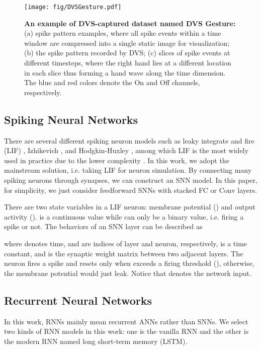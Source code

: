 \documentclass[journal,10pt,twocolumn]{IEEETran}
\begin{document}
\begin{figure}[!htbp]
\centering     
\texttt{[image: fig/DVSGesture.pdf]}
\caption{\textbf{An example of DVS-captured dataset named DVS Gesture:} (a) spike pattern examples, where all spike events within a time window  are compressed into a single static image for visualization; (b) the spike pattern recorded by DVS; (c) slices of spike events at different timesteps, where the right hand lies at a different location in each slice thus forming a hand wave along the time dimension. The blue and red colors denote the On and Off channels, respectively.} \label{fig:DVSGesture} 
\end{figure}

\subsection{Spiking Neural Networks}

There are several different spiking neuron models such as leaky integrate and fire (LIF) \cite{abbott1999lapicque}, Izhikevich \cite{izhikevich2003simple}, and Hodgkin-Huxley \cite{hodgkin1952quantitative}, among which LIF is the most widely used in practice due to the lower complexity \cite{izhikevich2004model}. In this work, we adopt the mainstream solution, i.e. taking LIF for neuron simulation. By connecting many spiking neurons through synapses, we can construct an SNN model. In this paper, for simplicity, we just consider feedforward SNNs with stacked FC or Conv layers.

There are two state variables in a LIF neuron: membrane potential () and output activity ().  is a continuous value while  can only be a binary value, i.e. firing a spike or not. The behaviors of an SNN layer can be described as

where  denotes time,  and  are indices of layer and neuron, respectively,  is a time constant, and  is the synaptic weight matrix between two adjacent layers. The neuron fires a spike and resets  only when  exceeds a firing threshold (), otherwise, the membrane potential would just leak. Notice that  denotes the network input.

\subsection{Recurrent Neural Networks}

In this work, RNNs mainly mean recurrent ANNs rather than SNNs. We select two kinds of RNN models in this work: one is the vanilla RNN and the other is the modern RNN named long short-term memory (LSTM).
\end{document}
